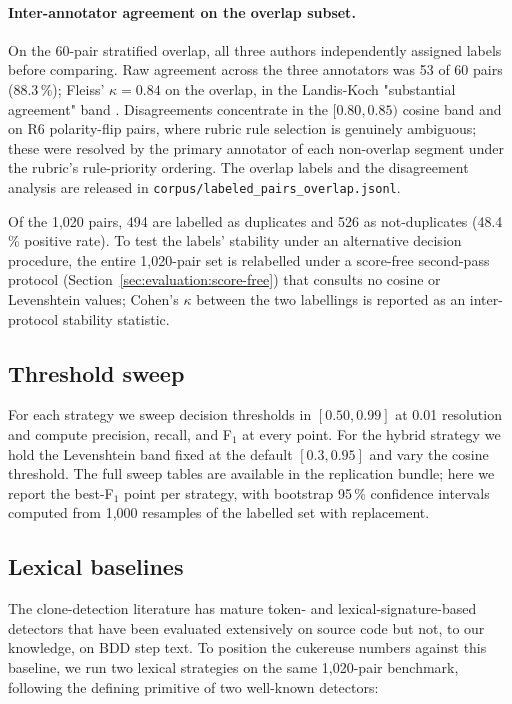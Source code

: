 \documentclass[11pt,a4paper]{article}
\begin{document}
\paragraph{Inter-annotator agreement on the overlap subset.} On the
60-pair stratified overlap, all three authors independently
assigned labels before comparing. Raw agreement across the three
annotators was 53 of 60 pairs (88.3\,\%); Fleiss' $\kappa = 0.84$
on the overlap, in the Landis-Koch "substantial agreement" band
\citep{landis1977kappa}. Disagreements concentrate in the
$[0.80, 0.85)$ cosine band and on R6 polarity-flip pairs, where
rubric rule selection is genuinely ambiguous; these were resolved
by the primary annotator of each non-overlap segment under the
rubric's rule-priority ordering. The overlap labels and the
disagreement analysis are released in
\texttt{corpus/labeled\_pairs\_overlap.jsonl}.

Of the 1{,}020 pairs, 494 are labelled as duplicates and 526 as
not-duplicates (48.4\,\% positive rate). To test the labels'
stability under an alternative decision procedure, the entire
1{,}020-pair set is relabelled under a score-free second-pass
protocol (Section~\ref{sec:evaluation:score-free}) that consults no
cosine or Levenshtein values; Cohen's $\kappa$
\citep{cohen1960kappa,landis1977kappa} between the two labellings
is reported as an inter-protocol stability statistic.

\subsection{Threshold sweep}

For each strategy we sweep decision thresholds in \([0.50, 0.99]\) at
0.01 resolution and compute precision, recall, and F$_1$ at every
point. For the hybrid strategy we hold the Levenshtein band fixed at
the default \([0.3, 0.95]\) and vary the cosine threshold. The full
sweep tables are available in the replication bundle; here we report
the best-F$_1$ point per strategy, with bootstrap 95\,\% confidence
intervals computed from 1{,}000 resamples of the labelled set with
replacement.

\subsection{Lexical baselines}
\label{sec:evaluation:baselines}

The clone-detection literature has mature token- and lexical-signature-based
detectors that have been evaluated extensively on source code but not,
to our knowledge, on BDD step text. To position the cukereuse numbers
against this baseline, we run two lexical strategies on the same
1{,}020-pair benchmark, following the defining primitive of two
well-known detectors:
\end{document}

